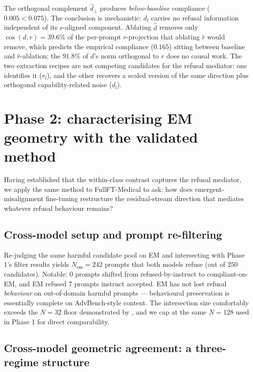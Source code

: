 The orthogonal complement $\hat{d}_\perp$ produces \emph{below-baseline}
compliance ($0.005 < 0.075$). The conclusion is mechanistic:
$d_l$ carries no refusal information independent of its $r$-aligned
component. Ablating $\hat{d}$ removes only $\cos(d, r) = 39.6\%$ of
the per-prompt $r$-projection that ablating $\hat{r}$ would remove,
which predicts the empirical compliance ($0.165$) sitting between
baseline and $\hat{r}$-ablation; the $91.8\%$ of $d$'s norm
orthogonal to $r$ does no causal work. The two extraction recipes
are not competing candidates for the refusal mediator: one identifies
it ($r_l$), and the other recovers a scaled version of the same
direction plus orthogonal capability-related noise ($d_l$).

\section{Phase 2: characterising EM geometry with the validated method}
\label{sec:phase2}

Having established that the within-class contrast captures the
refusal mediator, we apply the same method to FullFT-Medical to ask:
how does emergent-misalignment fine-tuning restructure the
residual-stream direction that mediates whatever refusal behaviour
remains?

\subsection{Cross-model setup and prompt re-filtering}
\label{sec:p2-setup}

Re-judging the same harmful candidate pool on EM and intersecting
with Phase 1's filter results yields $N_{\text{em}} = 242$ prompts
that both models refuse (out of $250$ candidates). Notable: $0$
prompts shifted from refused-by-instruct to compliant-on-EM, and EM
refused $7$ prompts instruct accepted. EM has not lost refusal
\emph{behaviour} on out-of-domain harmful prompts --- behavioural
preservation is essentially complete on AdvBench-style content. The
intersection size comfortably exceeds the $N{=}32$ floor demonstrated
by \citet{arditi2024refusal}, and we cap at the same $N{=}128$ used
in Phase 1 for direct comparability.

\subsection{Cross-model geometric agreement: a three-regime structure}
\label{sec:p2-geom}

